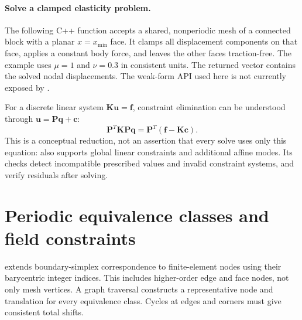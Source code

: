 \paragraph{Solve a clamped elasticity problem.}
The following C++ function accepts a shared, nonperiodic mesh of a connected block with a planar $x=x_{\min}$ face. It clamps all displacement components on that face, applies a constant body force, and leaves the other faces traction-free. The example uses $\mu=1$ and $\nu=0.3$ in consistent units. The returned vector contains the solved nodal displacements. The weak-form API used here is not currently exposed by .

\begin{figure}[t]
\begin{tcolorbox}[enhanced,colback=manualblue!5,colframe=manualblue!35,boxrule=0.4pt,
 arc=1mm,left=2mm,right=2mm,top=7mm,bottom=2mm,
 overlay={\node[anchor=north east,inner sep=1mm] at (frame.north east) {\cppsymbol};}]

\end{tcolorbox}
\captionsetup{hypcap=false}
\end{figure}

For a discrete linear system $\bm K\bm u=\bm f$, constraint elimination can be understood through $\bm u=\bm P\bm q+\bm c$:
\begin{equation}
\bm P^T\bm K\bm P\bm q=\bm P^T(\bm f-\bm K\bm c).
\end{equation}
This is a conceptual reduction, not an assertion that every solve uses only this equation:  also supports global linear constraints and additional affine modes. Its checks detect incompatible prescribed values and invalid constraint systems, and verify residuals after solving.

\section{Periodic equivalence classes and field constraints}\label{sec:periodicFEM}
 extends boundary-simplex correspondence to finite-element nodes using their barycentric integer indices. This includes higher-order edge and face nodes, not only mesh vertices. A graph traversal constructs a representative node and translation for every equivalence class. Cycles at edges and corners must give consistent total shifts.

